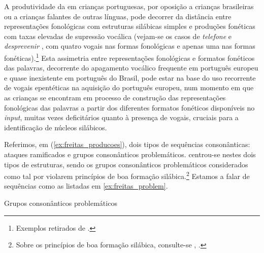 \documentclass[output=paper]{LSP/langsci}
\begin{document}
A produtividade da  em crianças portuguesas, por oposição a crianças brasileiras ou a crianças falantes de outras línguas, pode decorrer da distância entre representações fonológicas com estruturas silábicas simples e produções fonéticas com taxas elevadas de supressão vocálica (vejam-se os casos de \textit{telefone}  e \textit{desprevenir} , com quatro vogais nas formas fonológicas e apenas uma nas formas fonéticas).\footnote{Exemplos retirados de \citet[44]{mateusdandrade2000}.} Esta assimetria entre representações fonológicas e formatos fonéticos das palavras, decorrente do apagamento vocálico frequente em português europeu e quase inexistente em português do Brasil, pode estar na base do uso recorrente de vogais epentéticas na aquisição do português europeu, num momento em que as crianças se encontram em processo de construção das representações fonológicas das palavras a partir dos diferentes formatos fonéticos disponíveis no \textit{input}, muitas vezes deficitários quanto à presença de vogais, cruciais para a identificação de núcleos silábicos.

Referimos, em (\ref{ex:freitas_producoes}), dois tipos de sequências consonânticas: ataques ramificados e grupos consonânticos problemáticos. \citet{santos2013} centrou-se nestes dois tipos de estruturas, sendo os grupos consonânticos problemáticos considerados como tal por violarem princípios de boa formação silábica.\footnote{Sobre os princípios de boa formação silábica, consulte-se \citet{mateusdandrade2000}, \citet{freitassantos2001} \citet{mateus_etal2005}.} Estamos a falar de sequências como as listadas em \ref{ex:freitas_problem}.

\ea\label{ex:freitas_problem}
Grupos consonânticos problemáticos
\z
\z
\end{document}
